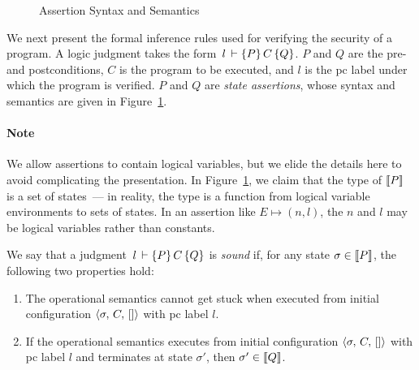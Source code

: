 \begin{figure}[!t]
\begin{comment}
P \Rightarrow Q \backslash x & \isdef
\left\{ \begin{aligned}
& \some{P' \Rightarrow Q'} & \text{if } P \backslash x = \some{P'} \text{ and } Q \backslash x = \some{Q'} \\
& \none & \text{otherwise}
\end{aligned} \right. \\
P * Q \backslash x & \isdef
\left\{ \begin{aligned}
& \some{P' * Q'} & \text{if } P \backslash x = \some{P'} \text{ and } Q \backslash x = \some{Q'} \\
& \none & \text{otherwise}
\end{aligned} \right.
\end{align*}
\end{comment}

\caption{Assertion Syntax and Semantics}
\label{assertion}
\end{figure}

We next present the formal inference rules used for verifying the security of a program.
A logic judgment takes the form $\, l \, \vdash \{P\} \, C \, \{Q\}$. $P$ and $Q$ are the pre- and postconditions, 
$C$ is the program to be executed, and $l$ is the pc label under which the program is verified.
$P$ and $Q$ are \emph{state assertions}, whose syntax and semantics are given in Figure~\ref{assertion}.

\vspace{-2mm}
\paragraph{\textbf{Note}}
We allow assertions to contain logical variables, but we elide the details here to avoid complicating
the presentation. In Figure~\ref{assertion}, we claim that the type of $\llbracket P \rrbracket$ is a set of states~---
in reality, the type is a function from logical variable environments to sets of states. In an
assertion like $E \mapsto (n,l)$, the $n$ and $l$ may be logical variables rather than constants.

\begin{definition}
\label{soundjudg}
We say that a judgment $\, l \, \vdash \{P\} \, C \, \{Q\}$ is \emph{sound} if, for any state $\sigma \in \llbracket P \rrbracket$,
the following two properties hold:
\begin{enumerate}
\item The operational semantics cannot get stuck when executed from initial configuration 
$\langle \sigma, \, C, \, [] \rangle$ with pc label $l$.
\item If the operational semantics executes from initial configuration $\langle \sigma, \, C, \, [] \rangle$ with
pc label $l$ and terminates at state $\sigma'$, then $\sigma' \in \llbracket Q \rrbracket$.
\end{enumerate}
\end{definition}

